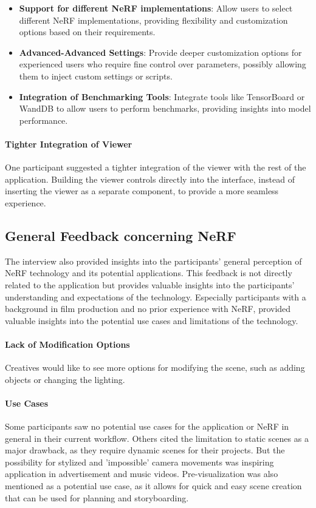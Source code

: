 \begin{itemize}
  \item \textbf{Support for different NeRF implementations}: Allow users to select different NeRF implementations, providing flexibility and customization options based on their requirements. 
  \cite{P1}
  \item \textbf{Advanced-Advanced Settings}: Provide deeper customization options for experienced users who require fine control over parameters, possibly allowing them to inject custom settings or scripts.
  \cite{P9}
  \item \textbf{Integration of Benchmarking Tools}: Integrate tools like TensorBoard or WandDB to allow users to perform benchmarks, providing insights into model performance.
  \cite{P10}
\end{itemize}



\paragraph{Tighter Integration of Viewer}
One participant suggested a tighter integration of the viewer with the rest of the application.
Building the viewer controls directly into the interface, instead of inserting the viewer as a separate component, to provide a more seamless experience.
\cite{P9}

\subsection*{General Feedback concerning NeRF}

The interview also provided insights into the participants' general perception of NeRF technology and its potential applications.
This feedback is not directly related to the application but provides valuable insights into the participants' understanding and expectations of the technology.
Especially participants with a background in film production and no prior experience with NeRF, provided valuable insights into the potential use cases and limitations of the technology.

\paragraph{Lack of Modification Options}
Creatives would like to see more options for modifying the scene, such as adding objects or changing the lighting.
\cite{P3}

\paragraph{Use Cases}
Some participants saw no potential use cases for the application or NeRF in general in their current workflow. 
\cite{P3}
Others cited the limitation to static scenes as a major drawback, as they require dynamic scenes for their projects. 
\cite{P4, P5}
But the possibility for stylized and 'impossible' camera movements was inspiring application in advertisement and music videos. 
\cite{P4}
Pre-visualization was also mentioned as a potential use case, as it allows for quick and easy scene creation that can be used for planning and storyboarding. 
\cite{P4}

